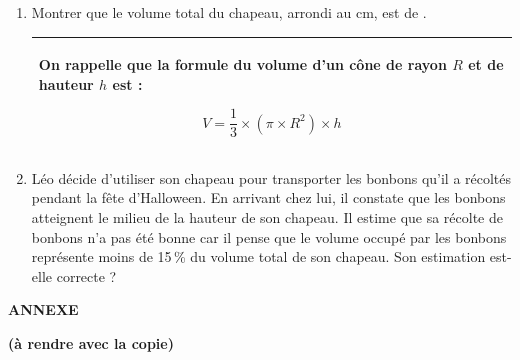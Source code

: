 \documentclass[11pt]{article}
\begin{document}
\begin{enumerate}
\item \begin{minipage}[t]{0.55\linewidth}
Montrer que le volume total du chapeau, \linebreak arrondi au cm, est de .


\begin{center}
\begin{tabularx}{0.9\linewidth}{|X|}\hline
On rappelle que la formule du volume d'un cône de rayon $R$ et de hauteur $h$ est :\index{volume du cône}

\[V=\dfrac{1}{3} \times\left(\pi \times R^{2}\right) \times h \]
\\\hline
\end{tabularx}
\end{center}
\end{minipage}
\hfill
{}

\item Léo décide d'utiliser son chapeau pour transporter les bonbons qu'il a récoltés pendant la fête d'Halloween. En arrivant chez lui, il constate que les bonbons atteignent le milieu de la hauteur de son chapeau. Il estime que sa récolte de bonbons n'a pas été bonne car il pense que le volume occupé par les bonbons représente moins de 15\,\% du volume total de son chapeau. Son estimation est-elle correcte ?
\end{enumerate}

\newpage

\begin{center}
\textbf{\Large ANNEXE}

\bigskip

\textbf{(à rendre avec la copie)}
\end{center}
\end{document}
